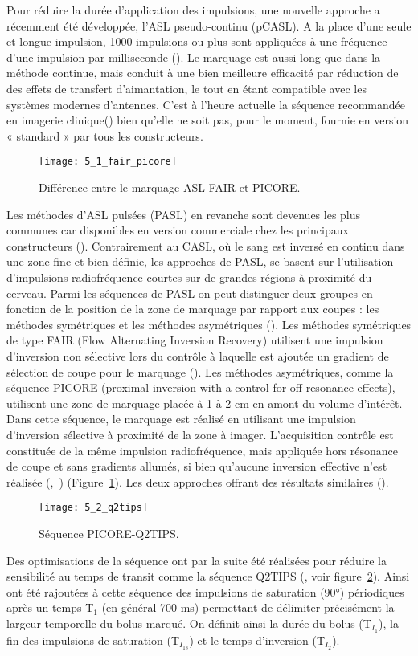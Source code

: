Pour réduire la durée d’application des impulsions, une nouvelle approche a récemment été développée, l’ASL pseudo-continu (pCASL). A la place d’une seule et longue impulsion, 1000 impulsions ou plus sont appliquées à une fréquence d’une impulsion par milliseconde (\cite{Dai2008}). Le marquage est aussi long que dans la méthode continue, mais conduit à une bien meilleure efficacité par réduction de des effets de transfert d’aimantation, le tout en étant compatible avec les systèmes modernes d’antennes. C’est à l’heure actuelle la séquence recommandée en imagerie clinique(\cite{Alsop2014}) bien qu’elle ne soit pas, pour le moment, fournie en version « standard » par tous les constructeurs.

\begin{figure}[!t]
\centering
\texttt{[image: 5\_1\_fair\_picore]}
\caption{Différence entre le marquage ASL FAIR et PICORE.}
\label{fig:5_1_fair_picore}	
\end{figure}
Les méthodes d’ASL pulsées (PASL) en revanche sont devenues les plus communes car disponibles en version commerciale chez les principaux constructeurs (\cite{Petersen2006}). Contrairement au CASL, où le sang est inversé en continu dans une zone fine et bien définie, les approches de PASL, se basent sur l’utilisation d’impulsions radiofréquence courtes sur de grandes régions à proximité du cerveau. Parmi les séquences de PASL on peut distinguer deux groupes en fonction de la position de la zone de marquage par rapport aux coupes : les méthodes symétriques et les méthodes asymétriques (\cite{Petersen2006}). Les méthodes symétriques de type FAIR (Flow Alternating Inversion Recovery) utilisent une impulsion d’inversion non sélective lors du contrôle à laquelle est ajoutée un gradient de sélection de coupe pour le marquage (\cite{Wong1997}).  Les méthodes asymétriques, comme la séquence PICORE (proximal inversion with a control for off-resonance effects), utilisent une zone de marquage placée à 1 à 2 cm en amont du volume d’intérêt. Dans cette séquence, le marquage est réalisé en utilisant une impulsion d’inversion sélective à proximité de la zone à imager. L’acquisition contrôle est constituée de la même impulsion radiofréquence, mais appliquée hors résonance de coupe et sans gradients allumés, si bien qu’aucune inversion effective n’est réalisée (\cite{Wong1997},~\cite{Buxton2009}) (Figure~\ref{fig:5_1_fair_picore}). Les deux approches offrant des résultats similaires (\cite{Cavusoglu2009}).

\begin{figure}[!t]
\centering
\texttt{[image: 5\_2\_q2tips]}
\caption{Séquence PICORE-Q2TIPS.}
\label{fig:5_2_q2tips}	
\end{figure}
Des optimisations de la séquence ont par la suite été réalisées pour réduire la sensibilité au temps de transit comme la séquence Q2TIPS (\cite{Luh1999}, voir figure~\ref{fig:5_2_q2tips}). Ainsi ont été rajoutées à cette séquence des impulsions de saturation (90°) périodiques après un temps T$_1$ (en général 700 ms) permettant de délimiter précisément la largeur temporelle du bolus marqué. On définit ainsi la durée du bolus (T$_{I_1}$), la fin des impulsions de saturation (T$_{I_{1s}}$) et le temps d’inversion (T$_{I_2}$).

